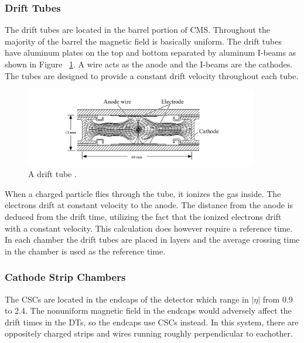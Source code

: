 \subsubsection{Drift Tubes}

The drift tubes are located in the barrel portion of CMS. Throughout the majority of the barrel the magnetic field is basically uniform. The drift tubes have aluminum plates on the top and bottom separated by aluminum I-beams as shown in Figure ~\ref{fig:dt}. A wire acts as the anode and the I-beams are the cathodes. The tubes are designed to provide a constant drift velocity throughout each tube.
\begin{figure}[h!]
  \centering
  \includegraphics[width=4in]{images/DT.png}
  \caption[A drift tube.]
   {A drift tube \cite{mutdr}.}
  \label{fig:dt}
\end{figure}

When a charged particle flies through the tube, it ionizes the gas inside. The electrons drift at constant velocity to the anode. The distance from the anode is deduced from the drift time, utilizing the fact that the ionized electrons drift with a constant velocity. This calculation does however require a reference time. In each chamber the drift tubes are placed in layers and the average crossing time in the chamber is used as the reference time.

\FloatBarrier
\subsubsection{Cathode Strip Chambers}

The CSCs are located in the endcaps of the detector which range in $|\eta|$ from 0.9 to 2.4. The nonuniform magnetic field in the endcaps would adversely affect the drift times in the DTs, so the endcaps use CSCs instead. In this system, there are oppositely charged strips and wires running roughly perpendicular to eachother.

